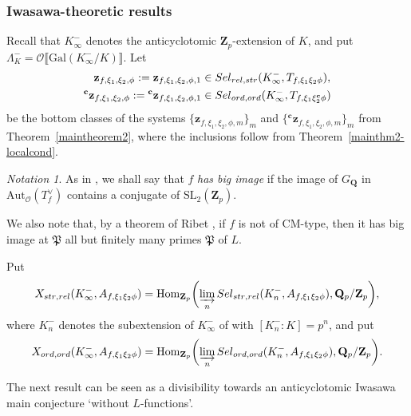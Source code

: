 \documentclass[10pt,letterpaper]{amsart}
\theoremstyle{plain}
\theoremstyle{definition}
\theoremstyle{definition}
\theoremstyle{plain}
\theoremstyle{plain}
\theoremstyle{plain}
\theoremstyle{remark}
\newtheorem{notation}[thm]{Notation}
\numberwithin{equation}{section}
\newcommand{\cc}{\mathbf{c}}
\newcommand{\Sel}{Sel}
\newcommand{\relstr}{{{\rm rel},{\rm str}}}
\newcommand{\strrel}{{{\rm str},{\rm rel}}}
\newcommand{\ord}{{{\rm ord},{\rm ord}}}
\def\cO{\mathcal O}
\newcommand{\Q}{\mathbf{Q}}
\newcommand{\Z}{\mathbf{Z}}
\def\Sel{{\rm Sel}}
\newcommand{\dBr}[1]{\llbracket{#1}\rrbracket}
\begin{document}
\subsubsection{Iwasawa-theoretic results}


Recall that $K_\infty^-$ denotes the anticyclotomic $\Z_p$-extension of $K$, and put $\Lambda_K^-=\cO\dBr{{\mathrm{Gal}}(K_\infty^-/K)}$. Let
\begin{align*}
\mathbf{z}_{f,\xi_1,\xi_2,\phi}:=\mathbf{z}_{f,\xi_1,\xi_2,\phi,1}&\in\Sel_{\relstr}(K_\infty^-,T_{f,\xi_1\xi_2\phi}),\\
{}^{\cc}\mathbf{z}_{f,\xi_1,\xi_2,\phi}:={}^\cc\mathbf{z}_{f,\xi_1,\xi_2,\phi,1}&\in\Sel_{\ord}(K_\infty^-,T_{f,\xi_1\xi_2^\cc\phi})
\end{align*}
be the bottom classes of the systems $\{\mathbf{z}_{f,\xi_1,\xi_2,\phi,m}\}_m$ and $\{{}^\cc\mathbf{z}_{f,\xi_1,\xi_2,\phi,m}\}_m$ from Theorem~\ref{maintheorem2}, where the inclusions follow from Theorem~\ref{mainthm2-localcond}.

\begin{notation}\label{notation-bigimage}
As in \cite[\S{7.1}]{LLZ-K}, we shall say that $f$ \emph{has big image} if the image of $G_\Q$ in ${\mathrm{Aut}}_{\cO}(T_f^\vee)$ contains a conjugate of $\mathrm{SL}_2(\Z_p)$.
\end{notation}

We also note that, by a theorem of Ribet \cite{Ribet-glasgow}, if $f$ is not of CM-type, then it has big image at $\mathfrak{P}$ all but finitely many primes $\mathfrak{P}$ of $L$.

Put 
\[
X_{\strrel}(K_\infty^-,A_{f,\xi_1\xi_2\phi})={\mathrm{Hom}}_{\Z_p}\biggl(\varinjlim_n\Sel_{\strrel}(K_n^-,A_{f,\xi_1\xi_2\phi}),\Q_p/\Z_p\biggr),
\]
where $K_n^-$ denotes the subextension of $K_\infty^-$ of with $[K_n^-:K]=p^n$, and put
\[
X_{\ord}(K_\infty^-,A_{f,\xi_1\xi_2\phi})={\mathrm{Hom}}_{\Z_p}\biggl(\varinjlim_n\Sel_{\ord}(K_n^-,A_{f,\xi_1\xi_2\phi}),\Q_p/\Z_p\biggr).
\]

The next result can be seen as a divisibility towards an anticyclotomic Iwasawa main conjecture `without $L$-functions'.
\end{document}
